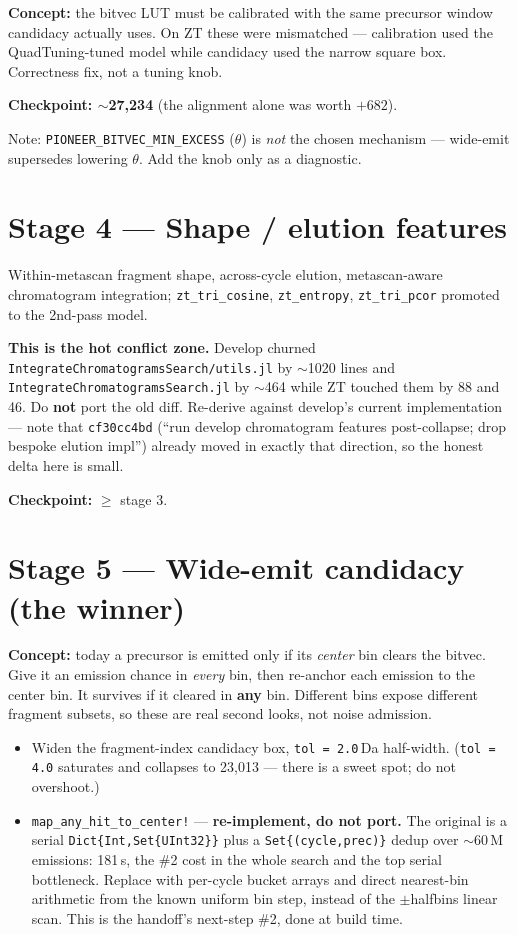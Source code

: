 \documentclass[11pt]{article}
\newcommand{\code}[1]{\texttt{\small #1}}
\begin{document}
\textbf{Concept:} the bitvec LUT must be calibrated with the same precursor window candidacy
actually uses. On ZT these were mismatched --- calibration used the QuadTuning-tuned model while
candidacy used the narrow square box. Correctness fix, not a tuning knob.

\textbf{Checkpoint: $\sim$27,234} (the alignment alone was worth $+682$).

Note: \code{PIONEER\_BITVEC\_MIN\_EXCESS} ($\theta$) is \emph{not} the chosen mechanism ---
wide-emit supersedes lowering $\theta$. Add the knob only as a diagnostic.

\section{Stage 4 --- Shape / elution features}

Within-metascan fragment shape, across-cycle elution, metascan-aware chromatogram integration;
\code{zt\_tri\_cosine}, \code{zt\_entropy}, \code{zt\_tri\_pcor} promoted to the 2nd-pass model.

\textbf{This is the hot conflict zone.} Develop churned
\code{IntegrateChromatogramsSearch/utils.jl} by $\sim$1020 lines and
\code{IntegrateChromatogramsSearch.jl} by $\sim$464 while ZT touched them by 88 and 46.
Do \textbf{not} port the old diff. Re-derive against develop's current implementation --- note
that \code{cf30cc4bd} (``run develop chromatogram features post-collapse; drop bespoke elution
impl'') already moved in exactly that direction, so the honest delta here is small.

\textbf{Checkpoint:} $\ge$ stage 3.

\section{Stage 5 --- Wide-emit candidacy (the winner)}

\textbf{Concept:} today a precursor is emitted only if its \emph{center} bin clears the bitvec.
Give it an emission chance in \emph{every} bin, then re-anchor each emission to the center bin. It
survives if it cleared in \textbf{any} bin. Different bins expose different fragment subsets, so
these are real second looks, not noise admission.

\begin{itemize}[leftmargin=*,itemsep=0.2em]
  \item Widen the fragment-index candidacy box, \code{tol = 2.0}\,Da half-width.
        (\code{tol = 4.0} saturates and collapses to 23,013 --- there is a sweet spot; do not
        overshoot.)
  \item \code{map\_any\_hit\_to\_center!} --- \textbf{re-implement, do not port.} The original is a
        serial \code{Dict\{Int,Set\{UInt32\}\}} plus a \code{Set\{(cycle,prec)\}} dedup over
        $\sim$60\,M emissions: 181\,s, the \#2 cost in the whole search and the top serial
        bottleneck. Replace with per-cycle bucket arrays and direct nearest-bin arithmetic from
        the known uniform bin step, instead of the $\pm$halfbins linear scan. This is the
        handoff's next-step \#2, done at build time.
\end{itemize}
\end{document}
